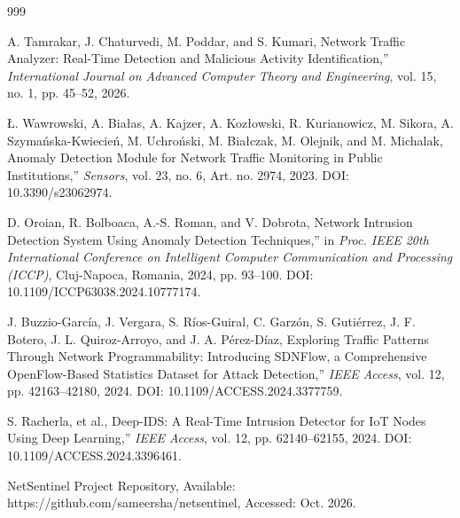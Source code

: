 \documentclass[a4paper,12pt]{report}
\begin{document}
	\vspace{1.5cm}
	
	\renewcommand{\bibname}{\uppercase{REFERENCES}}
	
	\begin{thebibliography}{999}
		
		
		A. Tamrakar, J. Chaturvedi, M. Poddar, and S. Kumari, Network Traffic Analyzer: Real-Time Detection and Malicious Activity Identification,'' \textit{International Journal on Advanced Computer Theory and Engineering}, vol. 15, no. 1, pp. 45--52, 2026.
		
		{\L}. Wawrowski, A. Bia{\l}as, A. Kajzer, A. Koz{\l}owski, R. Kurianowicz, M. Sikora, A. Szyma{\'n}ska-Kwiecie{\'n}, M. Uchro{\'n}ski, M. Bia{\l}czak, M. Olejnik, and M. Michalak, Anomaly Detection Module for Network Traffic Monitoring in Public Institutions,'' \textit{Sensors}, vol. 23, no. 6, Art. no. 2974, 2023. DOI: 10.3390/s23062974.
		
		D. Oroian, R. Bolboaca, A.-S. Roman, and V. Dobrota, Network Intrusion Detection System Using Anomaly Detection Techniques,'' in \textit{Proc. IEEE 20th International Conference on Intelligent Computer Communication and Processing (ICCP)}, Cluj-Napoca, Romania, 2024, pp. 93--100. DOI: 10.1109/ICCP63038.2024.10777174.
		
		J. Buzzio-Garc{\'i}a, J. Vergara, S. R{\'i}os-Guiral, C. Garz{\'o}n, S. Guti{\'e}rrez, J. F. Botero, J. L. Quiroz-Arroyo, and J. A. P{\'e}rez-D{\'i}az, Exploring Traffic Patterns Through Network Programmability: Introducing SDNFlow, a Comprehensive OpenFlow-Based Statistics Dataset for Attack Detection,'' \textit{IEEE Access}, vol. 12, pp. 42163--42180, 2024. DOI: 10.1109/ACCESS.2024.3377759.
		
		S. Racherla, et al., Deep-IDS: A Real-Time Intrusion Detector for IoT Nodes Using Deep Learning,'' \textit{IEEE Access}, vol. 12, pp. 62140--62155, 2024. DOI: 10.1109/ACCESS.2024.3396461.
		
		NetSentinel Project Repository, Available: https://github.com/sameersha/netsentinel, Accessed: Oct. 2026.
		
	\end{thebibliography}
	
\end{document}
